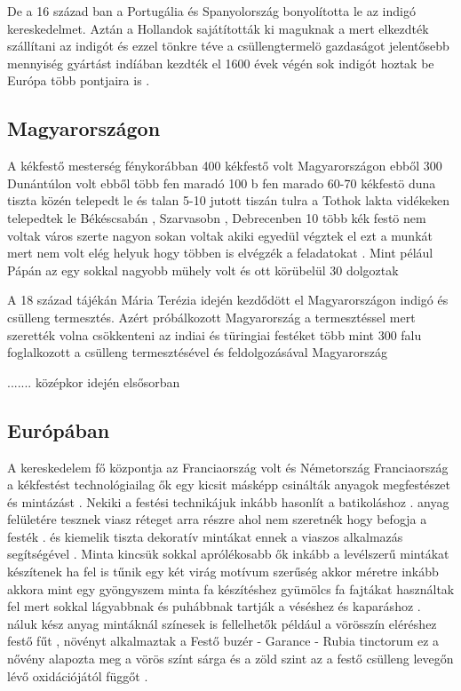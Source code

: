 \documentclass[fontsize=12pt, appendixprefix=true]{scrreprt}
\begin{document}
De a 16 század ban a Portugália és Spanyolország bonyolította le az indigó kereskedelmet.
Aztán a Hollandok sajátították ki maguknak a mert elkezdték szállítani az indigót és ezzel tönkre téve a csüllengtermelö gazdaságot 
jelentősebb mennyiség gyártást indíában kezdték el 1600 évek végén sok indigót hoztak be Európa több pontjaira is .




\subsection{Magyarországon}
A kékfestő mesterség fénykorábban 400 kékfestő volt  Magyarországon ebből 300 Dunántúlon volt ebből több fen maradó 100 b fen marado 60-70 kékfestö duna tiszta közén telepedt le és talan 5-10 jutott tiszán tulra a Tothok lakta vidékeken telepedtek  le Békéscsabán , Szarvasobn , Debrecenben 
10 több kék festö nem voltak város szerte 
nagyon sokan voltak akiki egyedül végztek el ezt a munkát mert nem volt elég helyuk hogy többen is elvégzék a feladatokat .
Mint pélául Pápán az egy sokkal nagyobb mühely volt és ott körübelül 30 dolgoztak 

A 18 század tájékán Mária Terézia idején kezdődött el Magyarországon  indigó és csülleng termesztés.
Azért próbálkozott Magyarország a termesztéssel mert szerették volna csökkenteni az indiai és türingiai festéket
több mint 300 falu foglalkozott a csülleng termesztésével  és feldolgozásával 
Magyarország 
   
.......
középkor idején elsősorban 

\subsection{Európában}
A kereskedelem fő központja az Franciaország volt és Németország 
Franciaország a kékfestést technológiailag ők egy kicsit másképp csinálták  anyagok megfestészet és mintázást .
Nekiki a festési technikájuk inkább hasonlít a batikoláshoz . anyag felületére tesznek viasz réteget arra részre ahol nem szeretnék hogy befogja a festék .
és kiemelik tiszta dekoratív  mintákat ennek a viaszos alkalmazás segítségével .
Minta kincsük sokkal aprólékosabb ők inkább a levélszerű mintákat készítenek ha fel is tűnik egy két virág motívum szerűség akkor méretre inkább akkora mint egy gyöngyszem 
minta fa készítéshez gyümölcs fa fajtákat használtak fel mert sokkal lágyabbnak és puhábbnak tartják a véséshez és kaparáshoz .
náluk kész anyag mintáknál színesek is  fellelhetők 
például a vörösszín eléréshez festő fűt , növényt alkalmaztak a Festő buzér - Garance - Rubia tinctorum  ez a nővény alapozta meg a vörös színt 
sárga és a zöld szint az a festő csülleng levegőn lévő oxidációjától  függőt .
\end{document}
